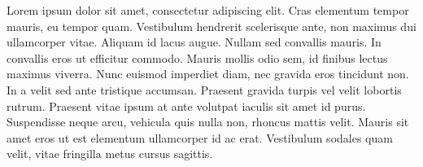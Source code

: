 \documentclass[conference]{IEEEtran}
\begin{document}
Lorem ipsum dolor sit amet, consectetur adipiscing elit. Cras elementum tempor mauris, eu tempor quam. Vestibulum hendrerit scelerisque ante, non maximus dui ullamcorper vitae. Aliquam id lacus augue. Nullam sed convallis mauris. In convallis eros ut efficitur commodo. Mauris mollis odio sem, id finibus lectus maximus viverra. Nunc euismod imperdiet diam, nec gravida eros tincidunt non. In a velit sed ante tristique accumsan. Praesent gravida turpis vel velit lobortis rutrum. Praesent vitae ipsum at ante volutpat iaculis sit amet id purus. Suspendisse neque arcu, vehicula quis nulla non, rhoncus mattis velit. Mauris sit amet eros ut est elementum ullamcorper id ac erat. Vestibulum sodales quam velit, vitae fringilla metus cursus sagittis.




\end{document}
